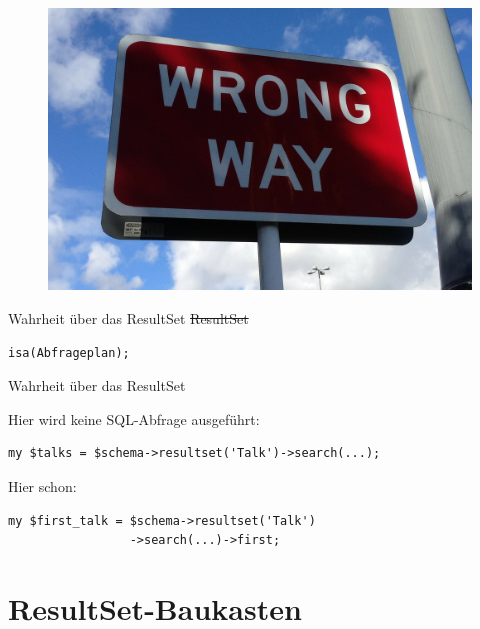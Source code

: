 
\begin{frame}{}
\begin{figure}[!ht]
\centering
\includegraphics[width=1\linewidth]{img/wrong-way.jpg}
\end{figure}
\end{frame}

\begin{frame}[fragile]{Wahrheit über das ResultSet}
\sout{ResultSet}

\begin{lstlisting}
isa(Abfrageplan);
\end{lstlisting}

\end{frame}

\begin{frame}[fragile]{Wahrheit über das ResultSet}

Hier wird keine SQL-Abfrage ausgeführt:

\begin{lstlisting}
my $talks = $schema->resultset('Talk')->search(...);
\end{lstlisting}

Hier schon:

\begin{lstlisting}
my $first_talk = $schema->resultset('Talk')
                 ->search(...)->first;
\end{lstlisting}

\end{frame}

\section{ResultSet-Baukasten}

